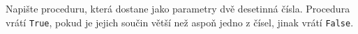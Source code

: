 \question[30]
Napište proceduru, která dostane jako parametry dvě desetinná čísla. Procedura
vrátí \texttt{True}, pokud je jejich součin větší než aspoň jedno z čísel,
jinak vrátí \texttt{False}.